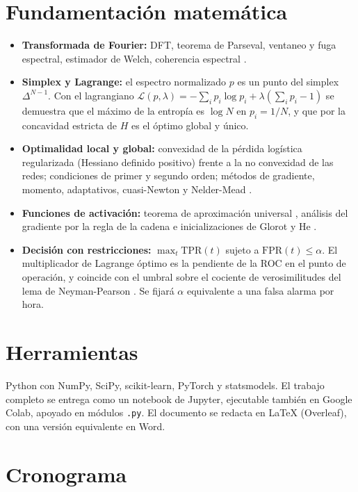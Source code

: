 \documentclass[11pt]{article}
\newcommand{\TPR}{\mathrm{TPR}}
\newcommand{\FPR}{\mathrm{FPR}}
\begin{document}
\section{Fundamentación matemática}

\begin{itemize}
  \item \textbf{Transformada de Fourier:} DFT, teorema de Parseval, ventaneo y fuga espectral, estimador de Welch, coherencia espectral \parencite{oppenheim2010,gonzalez2018}.
  \item \textbf{Simplex y Lagrange:} el espectro normalizado $p$ es un punto del simplex $\Delta^{N-1}$. Con el lagrangiano $\mathcal{L}(p,\lambda) = -\sum_i p_i\log p_i + \lambda(\sum_i p_i - 1)$ se demuestra que el máximo de la entropía es $\log N$ en $p_i = 1/N$, y que por la concavidad estricta de $H$ es el óptimo global y único.
  \item \textbf{Optimalidad local y global:} convexidad de la pérdida logística regularizada (Hessiano definido positivo) frente a la no convexidad de las redes; condiciones de primer y segundo orden; métodos de gradiente, momento, adaptativos, cuasi-Newton y Nelder-Mead \parencite{boyd2004,nocedal2006,nelder1965}.
  \item \textbf{Funciones de activación:} teorema de aproximación universal \parencite{cybenko1989,leshno1993}, análisis del gradiente por la regla de la cadena e inicializaciones de Glorot y He \parencite{glorot2010,he2015}.
  \item \textbf{Decisión con restricciones:} $\max_t \TPR(t)$ sujeto a $\FPR(t) \le \alpha$. El multiplicador de Lagrange óptimo es la pendiente de la ROC en el punto de operación, y coincide con el umbral sobre el cociente de verosimilitudes del lema de Neyman-Pearson \parencite{neyman1933,fawcett2006}. Se fijará $\alpha$ equivalente a una falsa alarma por hora.
\end{itemize}

\section{Herramientas}

Python con NumPy, SciPy, scikit-learn, PyTorch y statsmodels. El trabajo completo se entrega como un notebook de Jupyter, ejecutable también en Google Colab, apoyado en módulos \texttt{.py}. El documento se redacta en \LaTeX{} (Overleaf), con una versión equivalente en Word.

\section{Cronograma}
\end{document}
